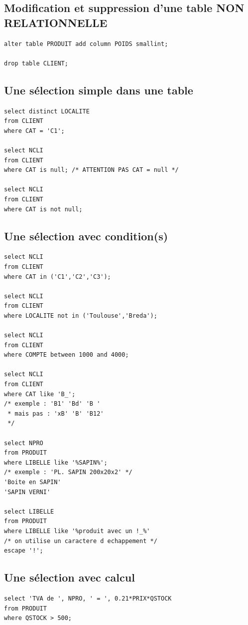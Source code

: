 \subsection{Modification et suppression d'une table NON RELATIONNELLE}
\begin{lstlisting}
alter table PRODUIT add column POIDS smallint;

drop table CLIENT;
\end{lstlisting}

\subsection{Une sélection simple dans une table}
\begin{lstlisting}
select distinct LOCALITE
from CLIENT
where CAT = 'C1';

select NCLI
from CLIENT
where CAT is null; /* ATTENTION PAS CAT = null */

select NCLI
from CLIENT
where CAT is not null;
\end{lstlisting}

\subsection{Une sélection avec condition(s)}
\begin{lstlisting}
select NCLI
from CLIENT
where CAT in ('C1','C2','C3');

select NCLI
from CLIENT
where LOCALITE not in ('Toulouse','Breda');

select NCLI
from CLIENT
where COMPTE between 1000 and 4000;

select NCLI
from CLIENT
where CAT like 'B_';
/* exemple : 'B1' 'Bd' 'B '
 * mais pas : 'xB' 'B' 'B12'
 */

select NPRO
from PRODUIT
where LIBELLE like '%SAPIN%';
/* exemple : 'PL. SAPIN 200x20x2' */
'Boite en SAPIN'
'SAPIN VERNI'

select LIBELLE
from PRODUIT
where LIBELLE like '%produit avec un !_%'
/* on utilise un caractere d echappement */
escape '!';
\end{lstlisting}

\subsection{Une sélection avec calcul}
\begin{lstlisting}
select 'TVA de ', NPRO, ' = ', 0.21*PRIX*QSTOCK
from PRODUIT
where QSTOCK > 500;
\end{lstlisting}

